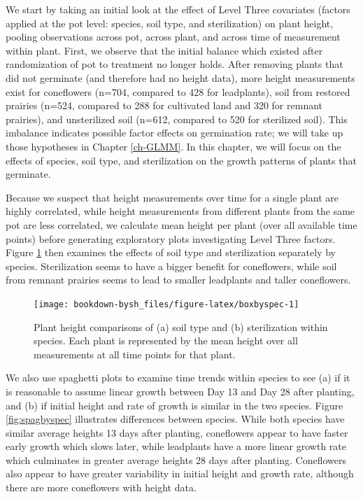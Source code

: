\documentclass[
]{krantz}
\begin{document}
We start by taking an initial look at the effect of Level Three covariates (factors applied at the pot level: species, soil type, and sterilization) on plant height, pooling observations across pot, across plant, and across time of measurement within plant. First, we observe that the initial balance which existed after randomization of pot to treatment no longer holds. After removing plants that did not germinate (and therefore had no height data), more height measurements exist for coneflowers (n=704, compared to 428 for leadplants), soil from restored prairies (n=524, compared to 288 for cultivated land and 320 for remnant prairies), and unsterilized soil (n=612, compared to 520 for sterilized soil). This imbalance indicates possible factor effects on germination rate; we will take up those hypotheses in Chapter \ref{ch-GLMM}. In this chapter, we will focus on the effects of species, soil type, and sterilization on the growth patterns of plants that germinate.

Because we suspect that height measurements over time for a single plant are highly correlated, while height measurements from different plants from the same pot are less correlated, we calculate mean height per plant (over all available time points) before generating exploratory plots investigating Level Three factors. Figure \ref{fig:boxbyspec} then examines the effects of soil type and sterilization separately by species. Sterilization seems to have a bigger benefit for coneflowers, while soil from remnant prairies seems to lead to smaller leadplants and taller coneflowers.

\begin{figure}

{\centering \texttt{[image: bookdown-bysh\_files/figure-latex/boxbyspec-1]} 

}

\caption{Plant height comparisons of (a) soil type and (b) sterilization within species.  Each plant is represented by the mean height over all measurements at all time points for that plant.}\label{fig:boxbyspec}
\end{figure}

We also use spaghetti plots to examine time trends within species to see (a) if it is reasonable to assume linear growth between Day 13 and Day 28 after planting, and (b) if initial height and rate of growth is similar in the two species. Figure \ref{fig:spagbyspec} illustrates differences between species. While both species have similar average heights 13 days after planting, coneflowers appear to have faster early growth which slows later, while leadplants have a more linear growth rate which culminates in greater average heights 28 days after planting. Coneflowers also appear to have greater variability in initial height and growth rate, although there are more coneflowers with height data.
\end{document}
